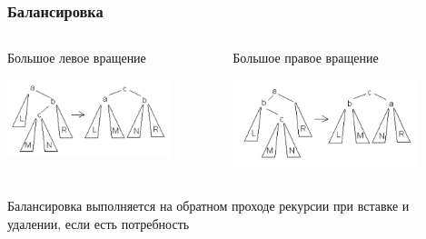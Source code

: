 \documentclass[xetex,mathserif,serif]{beamer}
\begin{document}
    \begin{frame}
        \frametitle{Балансировка}
        \begin{columns}
            \begin{column}{0.5\textwidth}
                Большое левое вращение
                \begin{center}
                    \includegraphics[width=0.8\textwidth]{big-left-rotation.png}
                \end{center}
            \end{column}
            \begin{column}{0.5\textwidth}
                Большое правое вращение
                \begin{center}
                    \includegraphics[width=0.8\textwidth]{big-right-rotation.png}
                \end{center}
            \end{column}
        \end{columns}
        Балансировка выполняется на обратном проходе рекурсии при вставке и удалении, если есть потребность
    \end{frame}
\end{document}
